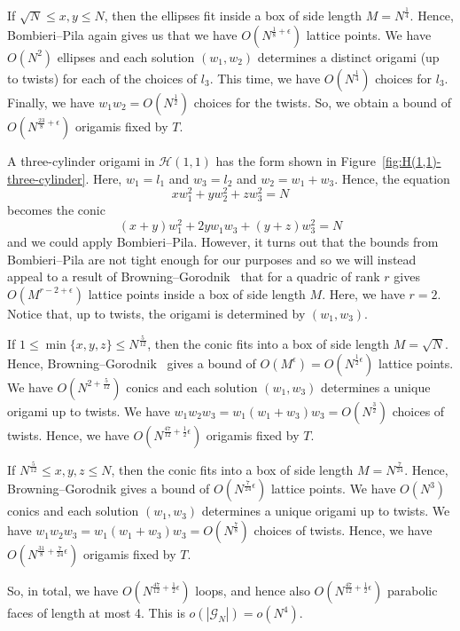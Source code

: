 \documentclass[a4paper,11pt]{amsart}
\numberwithin{equation}{section}
\numberwithin{figure}{section}
\numberwithin{table}{section}
\newcommand{\calH}{\mathcal{H}}
\begin{document}
If $\sqrt{N}\leq x,y\leq N$, then the ellipses fit inside a box of side length $M = N^{\frac{1}{4}}$. Hence, Bombieri--Pila again gives us that we have $O(N^{\frac{1}{8}+\epsilon})$ lattice points. We have $O(N^2)$ ellipses and each solution $(w_1,w_2)$ determines a distinct origami (up to twists) for each of the choices of $l_3$. This time, we have $O(N^{\frac{1}{4}})$ choices for $l_3$. Finally, we have $w_1w_2 = O(N^{\frac{1}{2}})$ choices for the twists. So, we obtain a bound of $O(N^{\frac{23}{8}+\epsilon})$ origamis fixed by $T$.

A three-cylinder origami in $\calH(1,1)$ has the form shown in Figure~\ref{fig:H(1,1)-three-cylinder}. Here, $w_1 = l_1$ and $w_3 = l_2$ and $w_2 = w_1+w_3$. Hence, the equation
\[xw_1^2+yw_2^2+zw_3^2 = N\]
becomes the conic
\[(x+y)w_1^2+2yw_1w_3+(y+z)w_3^2 = N\]
and we could apply Bombieri--Pila. However, it turns out that the bounds from Bombieri--Pila are not tight enough for our purposes and so we will instead appeal to a result of Browning--Gorodnik~\cite[Theorem 1.11]{BG} that for a quadric of rank $r$ gives $O(M^{r-2+\epsilon})$ lattice points inside a box of side length $M$. Here, we have $r = 2$. Notice that, up to twists, the origami is determined by $(w_1,w_3)$.

If $1\leq \min\{x,y,z\}\leq N^{\frac{5}{12}}$, then the conic fits into a box of side length $M = \sqrt{N}$. Hence, Browning--Gorodnik~\cite[Theorem 1.11]{BG} gives a bound of $O(M^{\epsilon}) = O(N^{\frac{1}{2}\epsilon})$ lattice points. We have $O(N^{2+\frac{5}{12}})$ conics and each solution $(w_1,w_3)$ determines a unique origami up to twists. We have $w_1w_2w_3= w_1(w_1+w_3)w_3 = O(N^{\frac{3}{2}})$ choices of twists. Hence, we have $O(N^{\frac{47}{12}+\frac{1}{2}\epsilon})$ origamis fixed by $T$.

If $N^{\frac{5}{12}}\leq x,y,z\leq N$, then the conic fits into a box of side length $M = N^{\frac{7}{24}}$. Hence, Browning--Gorodnik gives a bound of $O(N^{\frac{7}{24}\epsilon})$ lattice points. We have $O(N^{3})$ conics and each solution $(w_1,w_3)$ determines a unique origami up to twists. We have $w_1w_2w_3= w_1(w_1+w_3)w_3 = O(N^{\frac{7}{8}})$ choices of twists. Hence, we have $O(N^{\frac{31}{8}+\frac{7}{24}\epsilon})$ origamis fixed by $T$.

So, in total, we have $O(N^{\frac{47}{12}+\frac{1}{2}\epsilon})$ loops, and hence also $O(N^{\frac{47}{12}+\frac{1}{2}\epsilon})$ parabolic faces of length at most 4. This is $o(|\mathcal{G}_{N}|) = o(N^{4})$.
 
\end{document}
